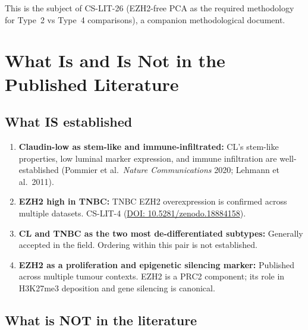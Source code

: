 \documentclass[12pt, a4paper]{article}
\begin{document}
This is the subject of CS-LIT-26
(EZH2-free PCA as the required methodology
for Type~2 vs Type~4 comparisons), a companion
methodological document.

\section{What Is and Is Not in the Published
Literature}

\subsection{What IS established}

\begin{enumerate}
    \item \textbf{Claudin-low as stem-like
    and immune-infiltrated:}
    CL's stem-like properties, low luminal
    marker expression, and immune infiltration
    are well-established (Pommier et al.\
    \textit{Nature Communications} 2020;
    Lehmann et al.\ 2011).

    \item \textbf{EZH2 high in TNBC:}
    TNBC EZH2 overexpression is confirmed
    across multiple datasets.
    CS-LIT-4 (\href{https://doi.org/10.5281/zenodo.18884158}
    {DOI: 10.5281/zenodo.18884158}).

    \item \textbf{CL and TNBC as the two most
    de-differentiated subtypes:}
    Generally accepted in the field.
    Ordering within this pair is not established.

    \item \textbf{EZH2 as a proliferation and
    epigenetic silencing marker:}
    Published across multiple tumour contexts.
    EZH2 is a PRC2 component; its role in
    H3K27me3 deposition and gene silencing
    is canonical.
\end{enumerate}

\subsection{What is NOT in the literature}
\end{document}
